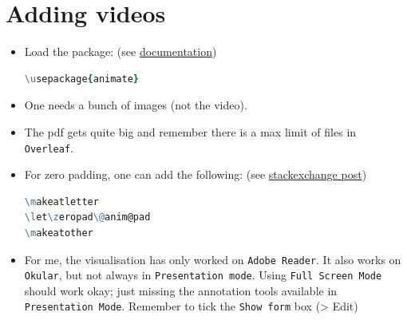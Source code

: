 \documentclass[aspectratio=169,11pt]{beamer}
\makeatletter
\let\zeropad\@anim@pad
\makeatother
\begin{document}
\section{Adding videos}
\begin{frame}[fragile]{\insertsection}
    \begin{itemize}
        \item Load the package:  (see \href{http://ctan.unsw.edu.au/macros/latex/contrib/animate/animate.pdf}{documentation})
        \begin{lstlisting}[language=tcl,numbers=none]
\usepackage{animate} \end{lstlisting}
        \item One needs a bunch of images (not the video). 
        \item The pdf gets quite big and remember there is a  max limit of files in \texttt{Overleaf}.
        \item For zero padding, one can add the following: (see \href{https://tex.stackexchange.com/questions/86632/how-to-deal-with-zero-padding-using-multiframe-in-the-animate-package}{stackexchange post})
        \begin{lstlisting}[language=tcl,numbers=none]
\makeatletter
\let\zeropad\@anim@pad
\makeatother\end{lstlisting}
        \item For me, the visualisation has only worked on \texttt{Adobe Reader}. It also works on \texttt{Okular}, but not always in \texttt{Presentation mode}. Using \texttt{Full Screen Mode} should work okay; just missing the annotation tools available in \texttt{Presentation Mode}. Remember to tick the \texttt{Show form} box (> Edit)
    \end{itemize}
\end{frame}


\begin{frame}{\insertsection}
    \begin{animateinline}[poster=last,autoplay,autopause,loop,controls]{20}
    }
    \end{animateinline}
\end{frame}
\end{document}
